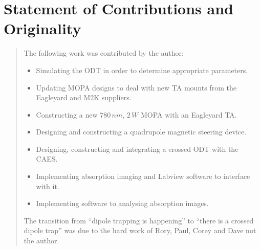 \chapter*{\centering \LARGE Statement of Contributions and Originality}
\begin{quotation}
\noindent

The following work was contributed by the author:
\begin{itemize}
\item Simulating the ODT in order to determine appropriate parameters.
\item Updating MOPA designs to deal with new TA mounts from the Eagleyard and M2K suppliers.
\item Constructing a new $780\,\unit{nm}$, $2\,\unit{W}$ MOPA with an Eagleyard TA.
\item Designing and constructing a quadrupole magnetic steering device.
\item Designing, constructing and integrating a crossed ODT with the CAES.
\item Implementing absorption imaging and Labview software to interface with it.
\item Implementing software to analysing absorption images.
\end{itemize}

The transition from ``dipole trapping is happening'' to ``there is a crossed dipole trap'' was due to the hard work of Rory, Paul, Corey and Dave not the author.

\end{quotation}
\clearpage
